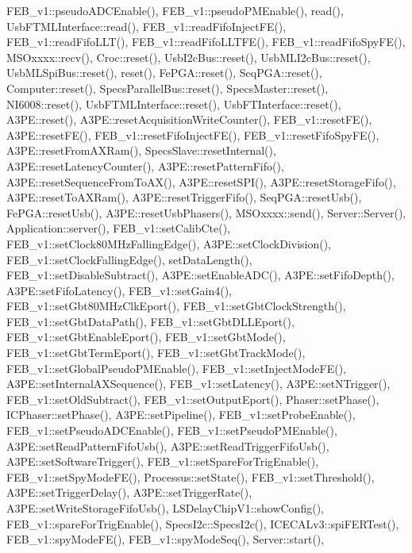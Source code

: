 F\+E\+B\+\_\+v1\+::pseudo\+A\+D\+C\+Enable(), F\+E\+B\+\_\+v1\+::pseudo\+P\+M\+Enable(), read(), Usb\+F\+T\+M\+L\+Interface\+::read(), F\+E\+B\+\_\+v1\+::read\+Fifo\+Inject\+F\+E(), F\+E\+B\+\_\+v1\+::read\+Fifo\+L\+L\+T(), F\+E\+B\+\_\+v1\+::read\+Fifo\+L\+L\+T\+F\+E(), F\+E\+B\+\_\+v1\+::read\+Fifo\+Spy\+F\+E(), M\+S\+Oxxxx\+::recv(), Croc\+::reset(), Usb\+I2c\+Bus\+::reset(), Usb\+M\+L\+I2c\+Bus\+::reset(), Usb\+M\+L\+Spi\+Bus\+::reset(), reset(), Fe\+P\+G\+A\+::reset(), Seq\+P\+G\+A\+::reset(), Computer\+::reset(), Specs\+Parallel\+Bus\+::reset(), Specs\+Master\+::reset(), N\+I6008\+::reset(), Usb\+F\+T\+M\+L\+Interface\+::reset(), Usb\+F\+T\+Interface\+::reset(), A3\+P\+E\+::reset(), A3\+P\+E\+::reset\+Acquisition\+Write\+Counter(), F\+E\+B\+\_\+v1\+::reset\+F\+E(), A3\+P\+E\+::reset\+F\+E(), F\+E\+B\+\_\+v1\+::reset\+Fifo\+Inject\+F\+E(), F\+E\+B\+\_\+v1\+::reset\+Fifo\+Spy\+F\+E(), A3\+P\+E\+::reset\+From\+A\+X\+Ram(), Specs\+Slave\+::reset\+Internal(), A3\+P\+E\+::reset\+Latency\+Counter(), A3\+P\+E\+::reset\+Pattern\+Fifo(), A3\+P\+E\+::reset\+Sequence\+From\+To\+A\+X(), A3\+P\+E\+::reset\+S\+P\+I(), A3\+P\+E\+::reset\+Storage\+Fifo(), A3\+P\+E\+::reset\+To\+A\+X\+Ram(), A3\+P\+E\+::reset\+Trigger\+Fifo(), Seq\+P\+G\+A\+::reset\+Usb(), Fe\+P\+G\+A\+::reset\+Usb(), A3\+P\+E\+::reset\+Usb\+Phasers(), M\+S\+Oxxxx\+::send(), Server\+::\+Server(), Application\+::server(), F\+E\+B\+\_\+v1\+::set\+Calib\+Cte(), F\+E\+B\+\_\+v1\+::set\+Clock80\+M\+Hz\+Falling\+Edge(), A3\+P\+E\+::set\+Clock\+Division(), F\+E\+B\+\_\+v1\+::set\+Clock\+Falling\+Edge(), set\+Data\+Length(), F\+E\+B\+\_\+v1\+::set\+Disable\+Subtract(), A3\+P\+E\+::set\+Enable\+A\+D\+C(), A3\+P\+E\+::set\+Fifo\+Depth(), A3\+P\+E\+::set\+Fifo\+Latency(), F\+E\+B\+\_\+v1\+::set\+Gain4(), F\+E\+B\+\_\+v1\+::set\+Gbt80\+M\+Hz\+Clk\+Eport(), F\+E\+B\+\_\+v1\+::set\+Gbt\+Clock\+Strength(), F\+E\+B\+\_\+v1\+::set\+Gbt\+Data\+Path(), F\+E\+B\+\_\+v1\+::set\+Gbt\+D\+L\+L\+Eport(), F\+E\+B\+\_\+v1\+::set\+Gbt\+Enable\+Eport(), F\+E\+B\+\_\+v1\+::set\+Gbt\+Mode(), F\+E\+B\+\_\+v1\+::set\+Gbt\+Term\+Eport(), F\+E\+B\+\_\+v1\+::set\+Gbt\+Track\+Mode(), F\+E\+B\+\_\+v1\+::set\+Global\+Pseudo\+P\+M\+Enable(), F\+E\+B\+\_\+v1\+::set\+Inject\+Mode\+F\+E(), A3\+P\+E\+::set\+Internal\+A\+X\+Sequence(), F\+E\+B\+\_\+v1\+::set\+Latency(), A3\+P\+E\+::set\+N\+Trigger(), F\+E\+B\+\_\+v1\+::set\+Old\+Subtract(), F\+E\+B\+\_\+v1\+::set\+Output\+Eport(), Phaser\+::set\+Phase(), I\+C\+Phaser\+::set\+Phase(), A3\+P\+E\+::set\+Pipeline(), F\+E\+B\+\_\+v1\+::set\+Probe\+Enable(), F\+E\+B\+\_\+v1\+::set\+Pseudo\+A\+D\+C\+Enable(), F\+E\+B\+\_\+v1\+::set\+Pseudo\+P\+M\+Enable(), A3\+P\+E\+::set\+Read\+Pattern\+Fifo\+Usb(), A3\+P\+E\+::set\+Read\+Trigger\+Fifo\+Usb(), A3\+P\+E\+::set\+Software\+Trigger(), F\+E\+B\+\_\+v1\+::set\+Spare\+For\+Trig\+Enable(), F\+E\+B\+\_\+v1\+::set\+Spy\+Mode\+F\+E(), Processus\+::set\+State(), F\+E\+B\+\_\+v1\+::set\+Threshold(), A3\+P\+E\+::set\+Trigger\+Delay(), A3\+P\+E\+::set\+Trigger\+Rate(), A3\+P\+E\+::set\+Write\+Storage\+Fifo\+Usb(), L\+S\+Delay\+Chip\+V1\+::show\+Config(), F\+E\+B\+\_\+v1\+::spare\+For\+Trig\+Enable(), Specs\+I2c\+::\+Specs\+I2c(), I\+C\+E\+C\+A\+Lv3\+::spi\+F\+E\+R\+Test(), F\+E\+B\+\_\+v1\+::spy\+Mode\+F\+E(), F\+E\+B\+\_\+v1\+::spy\+Mode\+Seq(), Server\+::start(), 